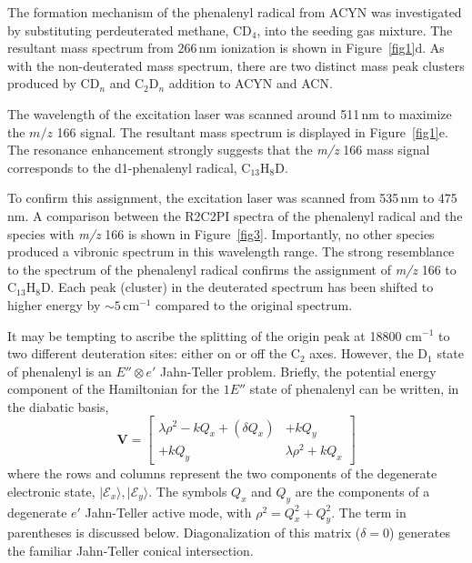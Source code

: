 \documentclass[journal=jacsat,manuscript=article,layout=onecolumn]{achemso}
\begin{document}
The formation mechanism of the phenalenyl radical from ACYN was investigated by substituting perdeuterated methane, CD$_4$, into the seeding gas mixture. The resultant mass spectrum from 266\,nm ionization is shown in Figure~\ref{fig1}d. As with the non-deuterated mass spectrum, there are two distinct mass peak clusters produced by CD$_n$ and C$_2$D$_n$ addition to ACYN and ACN.

The wavelength of the excitation laser was scanned around 511\,nm to maximize the $m/z$ 166 signal. The resultant mass spectrum is displayed in Figure~\ref{fig1}e. The resonance enhancement strongly suggests that the \textit{m/z} 166 mass signal corresponds to the d1-phenalenyl radical, C$_{13}$H$_8$D.

To confirm this assignment, the excitation laser was scanned from 535\,nm to 475\,nm. A comparison between the R2C2PI spectra of the phenalenyl radical and the species with \textit{m/z} 166 is shown in Figure~\ref{fig3}. Importantly, no other species produced a vibronic spectrum in this wavelength range. The strong resemblance to the spectrum of the phenalenyl radical confirms the assignment of \textit{m/z} 166 to C$_{13}$H$_8$D. Each peak (cluster) in the deuterated spectrum has been shifted to higher energy by $\sim5$\,cm$^{-1}$ compared to the original spectrum.

It may be tempting to ascribe the splitting of the origin peak at 18800 cm$^{-1}$ to two different deuteration sites: either on or off the C$_2$ axes. However, the D$_1$ state of phenalenyl is an $E''\otimes e'$ Jahn-Teller problem. Briefly, the potential energy component of the Hamiltonian for the $1E''$ state of phenalenyl can be written, in the diabatic basis,
\begin{equation}\label{JT}
  \mathbf{V} = \left[\begin{array}{cc}
                       \lambda\rho^2 - kQ_x + (\delta Q_x) & +kQ_y \\
                       +kQ_y &  \lambda\rho^2 + kQ_x
                     \end{array}
    \right]
\end{equation}
where the rows and columns represent the two components of the degenerate electronic state, $|\mathcal{E}_x\rangle,|\mathcal{E}_y\rangle$. The symbols $Q_x$ and $Q_y$ are the components of a degenerate $e'$ Jahn-Teller active mode, with $\rho^2=Q_x^2+Q_y^2$. The term in parentheses is discussed below. Diagonalization of this matrix ($\delta=0$) generates the familiar Jahn-Teller conical intersection.
\end{document}
